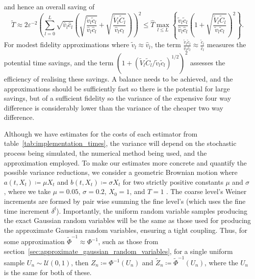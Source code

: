 \documentclass[manuscript,review]{acmart}
\begin{document}
and hence an overall saving of
\begin{equation*}
\widetilde{T} 
\approx 2\varepsilon^{-2} \left(\sum_{l=0}^L \sqrt{\hat{v}_l \hat{c}_l} \left( \sqrt{\dfrac{\tilde{v}_l\tilde{c}_l}{\hat{v}_l\hat{c}_l}} + \sqrt{\dfrac{\widetilde{V}_l \widetilde{C}_l}{\hat{v}_l \hat{c}_l}}\right)\right)^2 
\leq \widehat{T} \max_{l \leq L} \left\{ \dfrac{\tilde{v}_l\tilde{c}_l}{\hat{v}_l\hat{c}_l} \left(1 + \sqrt{\dfrac{\widetilde{V}_l \widetilde{C}_l}{\tilde{v}_l \tilde{c}_l}}\right)^2\right\}.
\end{equation*}
For modest fidelity approximations where $ \tilde{v}_l \approx \hat{v}_l $, the term $ \tfrac{\tilde{v}_l\tilde{c}_l}{\hat{v}_l\hat{c}_l} \approx \tfrac{\tilde{c}_l}{\hat{c}_l}$ measures the potential time savings, and the term $ (1 + (\widetilde{V}_l \widetilde{C}_l / \tilde{v}_l \tilde{c}_l)^{1/2})^2 $ assesses the efficiency of realising these savings. A balance needs to be achieved, and the approximations should be sufficiently fast so there is the potential for large savings, but of a sufficient fidelity so the variance of the expensive four way difference is considerably lower than the variance of the cheaper two way difference.

Although we have estimates for the costs of each estimator from table~\ref{tab:implementation_times}, the variance will depend on the stochastic process being simulated, the numerical method being used, and the approximation employed. To make our estimates more concrete and quantify the possible variance reductions, we consider a geometric Brownian motion where $ a(t, X_t) \coloneqq \mu X_t $ and $ b(t, X_t) \coloneqq \sigma X_t $ for two strictly positive constants $ \mu $ and $ \sigma $, where we take $ \mu = 0.05 $, $ \sigma = 0.2 $, $ X_0 = 1 $, and $ T = 1 $ \citep[6.1]{giles2008multilevel}. The coarse level's Weiner increments are formed by pair wise summing the fine level's (which uses the fine time increment $ \delta^{\mathrm{f}} $). Importantly, the uniform random variable samples producing the exact Gaussian random variables will be the same as those used for producing the approximate Gaussian random variables, ensuring a tight coupling. Thus, for some approximation $ \widetilde{\Phi}^{-1} \approx \Phi^{-1} $, such as those from section~\ref{sec:approximate_gaussian_random_variables}, for a single uniform sample $ U_n \sim \mathcal{U}(0, 1) $, then $ Z_n \coloneqq \Phi^{-1}(U_n) $ and $ \widetilde{Z}_n \coloneqq \widetilde{\Phi}^{-1}(U_n) $, where the $ U_n $ is the same for both of these.
\end{document}
